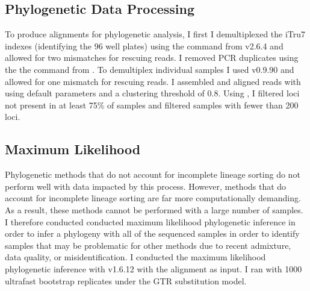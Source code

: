 \subsection{Phylogenetic Data Processing}
To produce alignments for phylogenetic analysis, I first I demultiplexed the 
iTru7 indexes (identifying the 96 well plates) using the \processradtags command from \stacks v2.6.4 
\parencites{rochette2019} and allowed for two mismatches for rescuing reads.
I removed PCR duplicates using the the \clonefilter command from \stacks.
To demultiplex individual samples I used \pyrad v0.9.90 and allowed for one 
mismatch for rescuing reads. 
I assembled and aligned reads with \pyrad using default parameters and a 
clustering threshold of 0.8. 
Using \pyrad, I filtered loci not present in at least 75\% of samples 
and filtered samples with fewer than 200 loci.

\subsection{Maximum Likelihood}
Phylogenetic methods that do not account for incomplete lineage sorting  
do not perform well with data impacted by this process.
However, methods that do account for incomplete lineage sorting are far more 
computationally demanding.
As a result, these methods cannot be performed with a large number of samples.
I therefore conducted conducted maximum likelihood phylogenetic inference in  
order to infer a phylogeny with all of the sequenced samples in order  
to identify samples that may be problematic for other methods due to recent 
admixture, data quality, or misidentification. 
I conducted the maximum likelihood phylogenetic inference with \iqtree 
v1.6.12 \parencite{nguyen2015} with the \pyrad alignment as input. 
I ran \iqtree with 1000 ultrafast bootstrap replicates \parencite{hoang2018}
under the GTR substitution model.

